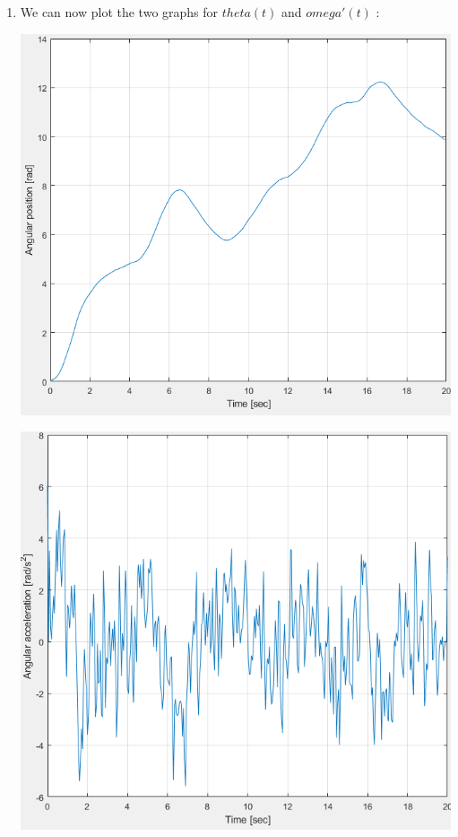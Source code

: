 \documentclass[a4paper,12pt]{article}
\begin{document}
\begin{enumerate}[label={\color{blue}\arabic*)}]
    \item
    We can now plot the two graphs for \(theta(t)\) and \(omega'(t)\) :
    \begin{multicols}{2}
    \begin{flushleft}
            \includegraphics[width=1\linewidth]{Images/theta.png}
            \label{Figure10}
        \end{flushleft}
    \columnbreak
    \begin{flushright}
            \includegraphics[width=1\linewidth]{Images/omega_dot.png}
            \label{Figure11}
        \end{flushright}
        

\end{multicols}
\end{enumerate}
\end{document}
